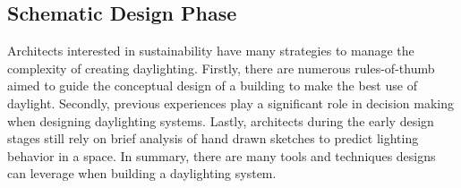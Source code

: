   \subsection{Schematic Design Phase}
    Architects interested in sustainability have many strategies to manage the complexity of creating daylighting.
    Firstly, there are numerous rules-of-thumb aimed to guide the conceptual design of a building to make the best use of daylight.
    Secondly, previous experiences play a significant role in decision making when designing daylighting systems. Lastly, architects during the early design stages still rely on brief analysis of hand drawn sketches to predict lighting behavior in a space. In summary, there are many tools and techniques designs can leverage when building a daylighting system.\\


